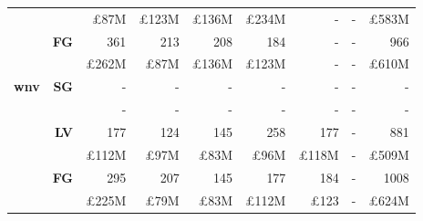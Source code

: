 \begin{table}[!htbp]
\begin{tabular}{r|r|r|r|r|r|r|r|r}
& {} & {\pounds87M} & {\pounds123M} & {\pounds136M} & {\pounds234M} & {-} & {-} & {\pounds583M}\\
\cline{2-9}
& \multirow{2}{*}{\textbf{FG}}
& {361} & {213} & {208} & {184} & {-} & {-} & {966}\\
& {} & {\pounds262M} & {\pounds87M} & {\pounds136M} & {\pounds123M} & {-} & {-} & {\pounds610M}\\
\hline
\multirow{6}{*}{\textbf{wnv}}
& \multirow{2}{*}{\textbf{SG}}
& {-} & {-} & {-} & {-} & {-} & {-} & {-}\\
& {} & {-} & {-} & {-} & {-} & {-} & {-} & {-}\\
\cline{2-9}
& \multirow{2}{*}{\textbf{LV}}
& {177} & {124} & {145} & {258} & {177} & {-} & {881}\\
& {} & {\pounds112M} & {\pounds97M} & {\pounds83M} & {\pounds96M} & {\pounds118M} & {-} & {\pounds509M}\\
\cline{2-9}
& \multirow{2}{*}{\textbf{FG}}
& {295} & {207} & {145} & {177} & {184} & {-} & {1008}\\
& {} & {\pounds225M} & {\pounds79M} & {\pounds83M} & {\pounds112M} & {\pounds123} & {-} & {\pounds624M}\\
\end{tabular}
\end{table}

